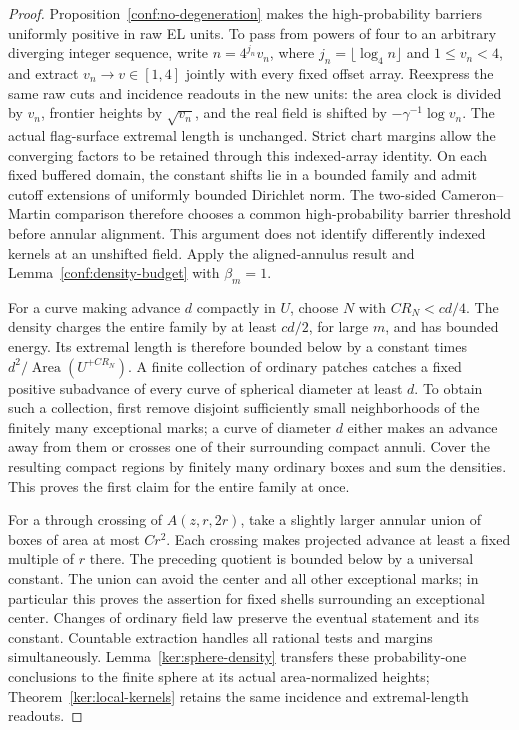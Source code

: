 \documentclass[11pt]{article}
\numberwithin{equation}{section}
\theoremstyle{definition}
\theoremstyle{remark}
\newcommand{\1}{\mathbf 1}
\begin{document}
\begin{proof}
Proposition~\ref{conf:no-degeneration} makes the high-probability
barriers uniformly positive in raw EL units. To pass from powers of four
to an arbitrary diverging integer sequence, write
$n=4^{j_n}v_n$, where $j_n=\lfloor\log_4 n\rfloor$ and $1\le v_n<4$,
and extract $v_n\to v\in[1,4]$ jointly with every fixed offset array.
Reexpress the same raw cuts and incidence readouts in the new units:
the area clock is divided by $v_n$, frontier heights by $\sqrt{v_n}$,
and the real field is shifted by $-\gamma^{-1}\log v_n$.
The actual flag-surface extremal length is unchanged. Strict chart
margins allow the converging factors to be retained through this
indexed-array identity. On each fixed buffered domain, the constant
shifts lie in a bounded family and admit cutoff extensions of uniformly
bounded Dirichlet norm. The two-sided Cameron--Martin comparison
therefore chooses a common high-probability barrier threshold before
annular alignment. This argument does not identify differently indexed
kernels at an unshifted field. Apply the aligned-annulus result and
Lemma~\ref{conf:density-budget} with \(\beta_m=1\).

For a curve making advance \(d\) compactly in \(U\), choose \(N\)
with \(CR_N<cd/4\).  The density charges the entire family by at
least \(cd/2\), for large \(m\), and has bounded energy.  Its
extremal length is therefore bounded below by a constant times
\(d^2/\operatorname{Area}(U^{+CR_N})\).  A finite collection of ordinary patches
catches a fixed positive subadvance of every curve of spherical
diameter at least \(d\).  To obtain such a collection, first remove
disjoint sufficiently small neighborhoods of the finitely many
exceptional marks; a curve of diameter \(d\) either makes an
advance away from them or crosses one of their surrounding compact
annuli.  Cover the resulting compact regions by finitely many
ordinary boxes and sum the densities.  This proves the first claim
for the entire family at once.

For a through crossing of \(A(z,r,2r)\), take a slightly larger
annular union of boxes of area at most \(Cr^2\).  Each crossing
makes projected advance at least a fixed multiple of \(r\) there.
The preceding quotient is bounded below by a universal constant.
The union can avoid the center and all other exceptional marks; in
particular this proves the assertion for fixed shells surrounding
an exceptional center.  Changes of ordinary field law preserve the
eventual statement and its constant.  Countable extraction handles
all rational tests and margins simultaneously. Lemma~\ref{ker:sphere-density}
transfers these probability-one conclusions to the finite sphere at its
actual area-normalized heights; Theorem~\ref{ker:local-kernels} retains
the same incidence and extremal-length readouts.
\end{proof}
\end{document}
